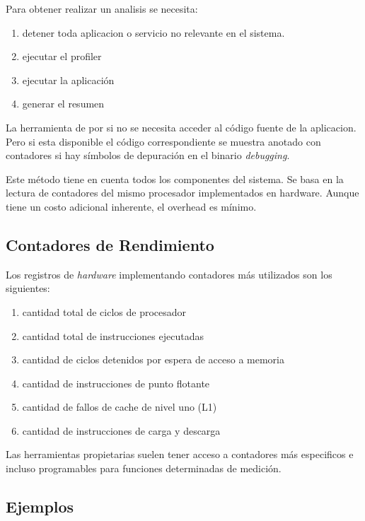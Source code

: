 \documentclass[a4paper]{report}
\begin{document}
Para obtener realizar un analisis se necesita:

\begin{enumerate}

\item detener toda aplicacion o servicio no relevante en el sistema.

\item ejecutar el profiler

\item ejecutar la aplicaci\'on

\item generar el resumen

\end{enumerate}

La herramienta de por si no se necesita acceder al c\'odigo fuente de la aplicacion.
Pero si esta disponible el c\'odigo correspondiente se muestra anotado con contadores
si hay s\'imbolos de depuraci\'on en el binario {\it debugging}.

Este m\'etodo tiene en cuenta todos los componentes del sistema.
Se basa en la lectura de contadores del mismo procesador implementados en hardware.
Aunque tiene un costo adicional inherente, el overhead es m\'inimo.

\subsection{Contadores de Rendimiento}

Los registros de {\it hardware} implementando contadores m\'as utilizados son los
siguientes:

\begin{enumerate}
\item cantidad total de ciclos de procesador
\item cantidad total de instrucciones ejecutadas
\item cantidad de ciclos detenidos por espera de acceso a memoria
\item cantidad de instrucciones de punto flotante
\item cantidad de fallos de cache de nivel uno (L1)
\item cantidad de instrucciones de carga y descarga
\end{enumerate}

Las herramientas propietarias suelen tener acceso a contadores m\'as especificos e
incluso programables para funciones determinadas de medici\'on.

\subsection{Ejemplos}
\end{document}
